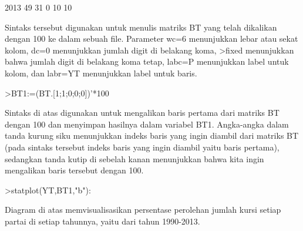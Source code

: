 \documentclass[a4paper,10pt]{article}
\begin{document}
\begin{eulernotebook}
\begin{eulercomment}
\begin{eulercomment}
\begin{eulercomment}
\begin{eulercomment}
\begin{eulercomment}
\begin{eulercomment}
\begin{eulercomment}
\begin{eulercomment}
\begin{eulercomment}
\begin{eulercomment}
\begin{eulercomment}
\begin{eulercomment}
\begin{eulercomment}
\begin{eulercomment}
\begin{eulercomment}
\begin{eulercomment}
\begin{eulercomment}
\begin{eulercomment}
\begin{euleroutput}
    2013      49    31     0    10    10
\end{euleroutput}
\begin{eulercomment}
Sintaks tersebut digunakan untuk menulis matriks BT yang telah
dikalikan dengan 100 ke dalam sebuah file. Parameter wc=6 menunjukkan
lebar atau sekat kolom, dc=0 menunjukkan jumlah digit di belakang
koma, \textgreater{}fixed menunjukkan bahwa jumlah digit di belakang koma tetap,
labc=P menunjukkan label untuk kolom, dan labr=YT menunjukkan label
untuk baris.
\end{eulercomment}
\begin{eulerprompt}
>BT1:=(BT.[1;1;0;0;0])'*100
\end{eulerprompt}
\begin{euleroutput}
  [84.29,  81.25,  81.1659,  82.7529,  72.9642,  61.8971,  79.8732]
\end{euleroutput}
\begin{eulercomment}
Sintaks di atas digunakan untuk mengalikan baris pertama dari matriks
BT dengan 100 dan menyimpan hasilnya dalam variabel BT1.  Angka-angka
dalam tanda kurung siku menunjukkan indeks baris yang ingin diambil
dari matriks BT (pada sintaks tersebut indeks baris yang ingin diambil
yaitu baris pertama), sedangkan tanda kutip di sebelah kanan
menunjukkan bahwa kita ingin mengalikan baris tersebut dengan 100.
\end{eulercomment}
\begin{eulerprompt}
>statplot(YT,BT1,"b"):
\end{eulerprompt}
\begin{eulercomment}
Diagram di atas memvisualisasikan persentase perolehan jumlah kursi
setiap partai di setiap tahunnya, yaitu dari tahun 1990-2013.


\end{eulercomment}
\end{eulercomment}
\end{eulercomment}
\end{eulercomment}
\end{eulercomment}
\end{eulercomment}
\end{eulercomment}
\end{eulercomment}
\end{eulercomment}
\end{eulercomment}
\end{eulercomment}
\end{eulercomment}
\end{eulercomment}
\end{eulercomment}
\end{eulercomment}
\end{eulercomment}
\end{eulercomment}
\end{eulercomment}
\end{eulercomment}
\end{eulernotebook}
\end{document}
